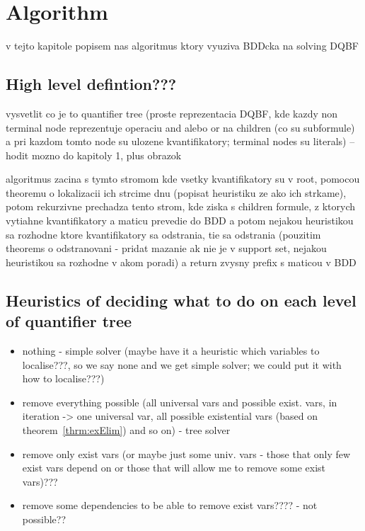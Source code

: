 \documentclass[
  digital, %
  twoside, %
  table,   %
  nolof,     %
  nolot,     %
]{fithesis3}
\theoremstyle{definition}
\theoremstyle{remark}
\begin{document}
\chapter{Algorithm}
\label{chap:algorithm}

v tejto kapitole popisem nas algoritmus ktory vyuziva BDDcka na solving DQBF

\section{High level defintion???}
vysvetlit co je to quantifier tree (proste reprezentacia DQBF, kde kazdy non terminal node reprezentuje operaciu and alebo or na children (co su subformule) a pri kazdom tomto node su ulozene kvantifikatory; terminal nodes su literals) -- hodit mozno do kapitoly 1, plus obrazok

algoritmus zacina s tymto stromom kde vsetky kvantifikatory su v root, pomocou theoremu o lokalizacii ich strcime dnu (popisat heuristiku ze ako ich strkame), potom rekurzivne prechadza tento strom, kde ziska s children formule, z ktorych vytiahne kvantifikatory a maticu prevedie do BDD a potom nejakou heuristikou sa rozhodne ktore kvantifikatory sa odstrania, tie sa odstrania (pouzitim theorems o odstranovani - pridat mazanie ak nie je v support set, nejakou heuristikou sa rozhodne v akom poradi) a return zvysny prefix s maticou v BDD

\section{Heuristics of deciding what to do on each level of quantifier tree}
\begin{itemize}
    \item nothing - simple solver (maybe have it a heuristic which variables to localise???, so we say none and we get simple solver; we could put it with how to localise???)
    \item remove everything possible (all universal vars and possible exist. vars, in iteration -> one universal var, all possible existential vars (based on theorem~\ref{thrm:exElim}) and so on) - tree solver
    \item remove only exist vars (or maybe just some univ. vars - those that only few exist vars depend on or those that will allow me to remove some exist vars)???
    \item remove some dependencies to be able to remove exist vars???? - not possible??
\end{itemize}
\end{document}
